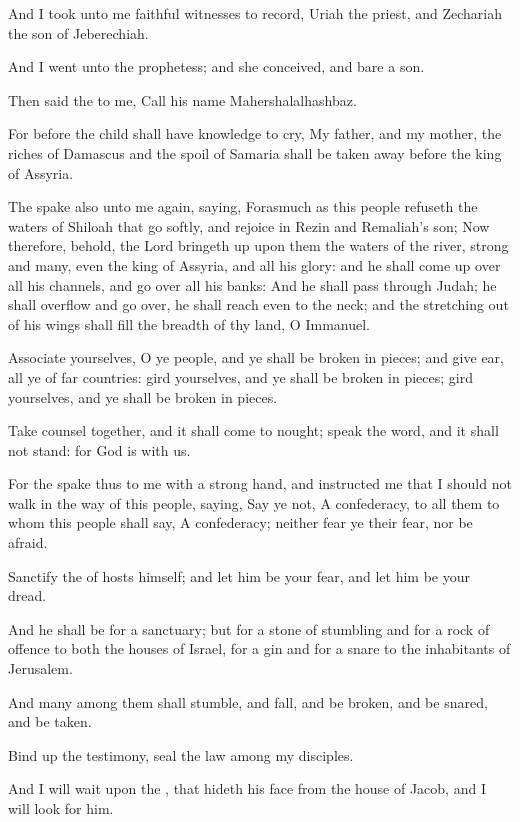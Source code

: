 \Verse And I took unto me faithful witnesses to record, Uriah the priest, and Zechariah the son of Jeberechiah.

\Verse And I went unto the prophetess; and she conceived, and bare a son.

Then said the \LORD to me, Call his name Mahershalalhashbaz.

\Verse For before the child shall have knowledge to cry, My father, and my mother, the riches of Damascus and the spoil of Samaria shall be taken away before the king of Assyria.

\Verse The \LORD spake also unto me again, saying, \Verse Forasmuch as this people refuseth the waters of Shiloah that go softly, and rejoice in Rezin and Remaliah's son; \Verse Now therefore, behold, the Lord bringeth up upon them the waters of the river, strong and many, even the king of Assyria, and all his glory: and he shall come up over all his channels, and go over all his banks: \Verse And he shall pass through Judah; he shall overflow and go over, he shall reach even to the neck; and the stretching out of his wings shall fill the breadth of thy land, O Immanuel.

\Verse Associate yourselves, O ye people, and ye shall be broken in pieces; and give ear, all ye of far countries: gird yourselves, and ye shall be broken in pieces; gird yourselves, and ye shall be broken in pieces.

\Verse Take counsel together, and it shall come to nought; speak the word, and it shall not stand: for God is with us.

\Verse For the \LORD spake thus to me with a strong hand, and instructed me that I should not walk in the way of this people, saying, \Verse Say ye not, A confederacy, to all them to whom this people shall say, A confederacy; neither fear ye their fear, nor be afraid.

\Verse Sanctify the \LORD of hosts himself; and let him be your fear, and let him be your dread.

\Verse And he shall be for a sanctuary; but for a stone of stumbling and for a rock of offence to both the houses of Israel, for a gin and for a snare to the inhabitants of Jerusalem.

\Verse And many among them shall stumble, and fall, and be broken, and be snared, and be taken.

\Verse Bind up the testimony, seal the law among my disciples.

\Verse And I will wait upon the \LORD, that hideth his face from the house of Jacob, and I will look for him.

